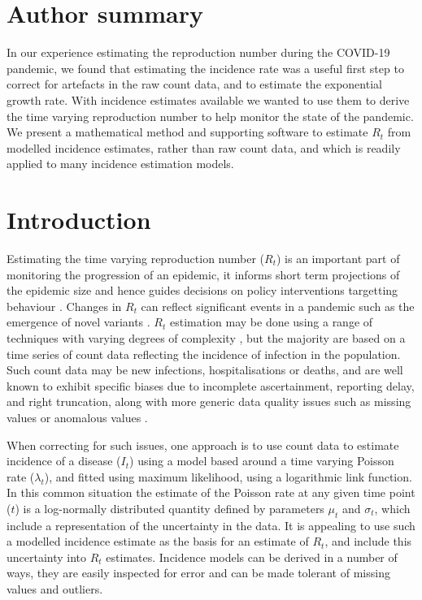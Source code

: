 \documentclass[10pt,letterpaper]{article}
\begin{document}
\section*{Author summary}

In our experience estimating the reproduction number during the COVID-19 pandemic, we found that estimating the incidence rate was a useful first step to correct for artefacts in the raw count data, and to estimate the exponential growth rate. With incidence estimates available we wanted to use them to derive the time varying reproduction number to help monitor the state of the pandemic. We present a mathematical method and supporting software to estimate $R_t$ from modelled incidence estimates, rather than raw count data, and which is readily applied to many incidence estimation models.

\linenumbers

\section*{Introduction}

Estimating the time varying reproduction number ($R_t$) is an important part of monitoring the progression of an epidemic, it informs short term projections of the epidemic size and hence guides decisions on policy interventions targetting behaviour \cite{gostic2020}. Changes in $R_t$ can reflect significant events in a pandemic such as the emergence of novel variants \cite{davies2021}. $R_t$ estimation may be done using a range of techniques with varying degrees of complexity \cite{abbott2024,alvarez2021,parag2021,thompson2019,wallinga2006,steyn2024,nash2023,nash2022,gressani2022,cauchemez2006,hong2020,johnson2021,ogi-gittins2024}, but the majority are based on a time series of count data reflecting the incidence of infection in the population. Such count data may be new infections, hospitalisations or deaths, and are well known to exhibit specific biases due to incomplete ascertainment, reporting delay, and right truncation, along with more generic data quality issues such as missing values or anomalous values \cite{abbott2020}.

When correcting for such issues, one approach is to use count data to estimate incidence of a disease ($I_t$) using a model based around a time varying Poisson rate ($\lambda_t$), and fitted using maximum likelihood, using a logarithmic link function. In this common situation the estimate of the Poisson rate at any given time point ($t$) is a log-normally distributed quantity defined by parameters $\mu_t$ and $\sigma_t$, which include a representation of the uncertainty in the data. It is appealing to use such a modelled incidence estimate as the basis for an estimate of $R_t$, and include this uncertainty into $R_t$ estimates. Incidence models can be derived in a number of ways, they are easily inspected for error and can be made tolerant of missing values and outliers.
\end{document}
